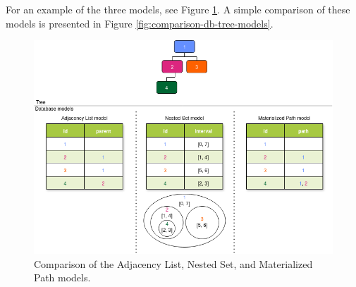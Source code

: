 For an example of the three models, see Figure \ref{fig:comparison-db-tree-models-pic}.
A simple comparison of these models is presented in Figure \ref{fig:comparison-db-tree-models}.

\begin{figure}[H]
	\centering
	\includegraphics[scale=0.6]{./images/tree-map.drawio.png}
	\caption{Comparison of the Adjacency List, Nested Set, and Materialized Path models.}
	\label{fig:comparison-db-tree-models-pic}
\end{figure}

\newcommand{\goodcomplexity}[1]{\vspace{.4em}\textcolor{darkgreen}{\checkmark}\vspace{.4em}}
\newcommand{\mediumcomplexity}[1]{\vspace{.4em}\textcolor{orange}{\textcircled{}}\vspace{.4em}}
\newcommand{\badcomplexity}[1]{\vspace{.4em}\textcolor{red}{X}\vspace{.4em}}

\newcommand{\goodefficency}[1]{\textcolor{darkgreen}{\checkmark}}
\newcommand{\mediumefficency}[1]{\textcolor{orange}{\textcircled{}}}
\newcommand{\badefficency}[1]{\textcolor{red}{X}}

